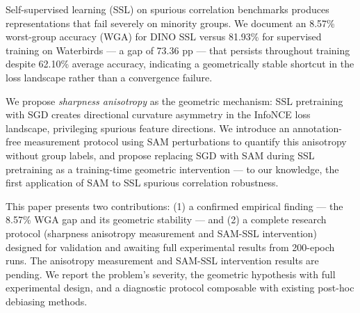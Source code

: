 
Self-supervised learning (SSL) on spurious correlation benchmarks produces representations that fail severely on minority groups. We document an 8.57\% worst-group accuracy (WGA) for DINO SSL versus 81.93\% for supervised training on Waterbirds --- a gap of 73.36 pp --- that persists throughout training despite 62.10\% average accuracy, indicating a geometrically stable shortcut in the loss landscape rather than a convergence failure.

We propose \textit{sharpness anisotropy} as the geometric mechanism: SSL pretraining with SGD creates directional curvature asymmetry in the InfoNCE loss landscape, privileging spurious feature directions. We introduce an annotation-free measurement protocol using SAM perturbations to quantify this anisotropy without group labels, and propose replacing SGD with SAM during SSL pretraining as a training-time geometric intervention --- to our knowledge, the first application of SAM to SSL spurious correlation robustness.

This paper presents two contributions: (1) a confirmed empirical finding --- the 8.57\% WGA gap and its geometric stability --- and (2) a complete research protocol (sharpness anisotropy measurement and SAM-SSL intervention) designed for validation and awaiting full experimental results from 200-epoch runs. The anisotropy measurement and SAM-SSL intervention results are pending. We report the problem's severity, the geometric hypothesis with full experimental design, and a diagnostic protocol composable with existing post-hoc debiasing methods.

